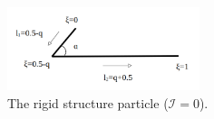 \documentclass[a4paper,12pt]{report}
\begin{document}
\begin{figure}[!h]
	\begin{center}
		\includegraphics[width=0.5\textwidth]{plot/tensile_boomerang.png}
		\caption{The rigid structure particle ($\mathcal{I}=0$).}
		\label{fig:16}
	\end{center}
\end{figure}
\end{document}
